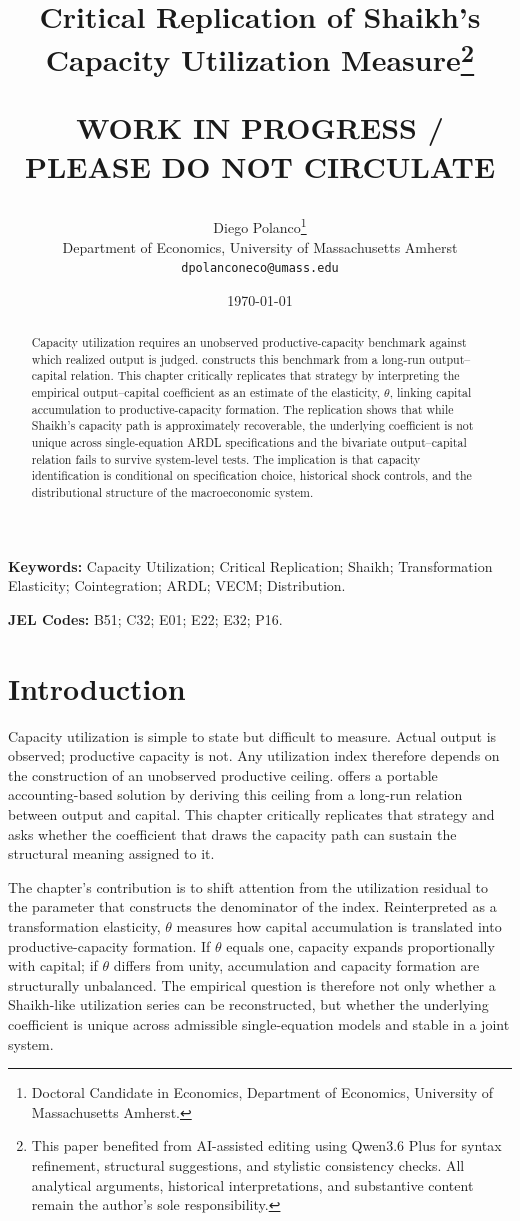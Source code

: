 \documentclass[11pt]{article}
\title{Critical Replication of Shaikh's Capacity Utilization Measure\thanks{This paper benefited from AI-assisted editing using Qwen3.6 Plus for syntax refinement, structural suggestions, and stylistic consistency checks. All analytical arguments, historical interpretations, and substantive content remain the author's sole responsibility.}\\
\begin{large}
\textbf{WORK IN PROGRESS / PLEASE DO NOT CIRCULATE}     
\end{large}
}
\author{Diego Polanco\thanks{Doctoral Candidate in Economics, Department of Economics, University of Massachusetts Amherst.}\\
Department of Economics, University of Massachusetts Amherst\\
\texttt{dpolanconeco@umass.edu}}
\date{\today}
\begin{document}
\maketitle


\begin{abstract}
Capacity utilization requires an unobserved productive-capacity benchmark against which realized output is judged. \citet{Shaikh2016} constructs this benchmark from a long-run output--capital relation. This chapter critically replicates that strategy by interpreting the empirical output--capital coefficient as an estimate of the elasticity, $\theta$, linking capital accumulation to productive-capacity formation. The replication shows that while Shaikh’s capacity path is approximately recoverable, the underlying coefficient is not unique across single-equation ARDL specifications and the bivariate output--capital relation fails to survive system-level tests. The implication is that capacity identification is conditional on specification choice, historical shock controls, and the distributional structure of the macroeconomic system.
\end{abstract}


\vspace{1cm}

\noindent\textbf{Keywords:} Capacity Utilization; Critical Replication; Shaikh; Transformation Elasticity; Cointegration; ARDL; VECM; Distribution.

\noindent\textbf{JEL Codes:} B51; C32; E01; E22; E32; P16.

\pagebreak
\section{Introduction}
\label{sec:introduction}

Capacity utilization is simple to state but difficult to measure. Actual output is observed; productive capacity is not. Any utilization index therefore depends on the construction of an unobserved productive ceiling. \citet{Shaikh2016} offers a portable accounting-based solution by deriving this ceiling from a long-run relation between output and capital. This chapter critically replicates that strategy and asks whether the coefficient that draws the capacity path can sustain the structural meaning assigned to it.

The chapter’s contribution is to shift attention from the utilization residual to the parameter that constructs the denominator of the index. Reinterpreted as a transformation elasticity, $\theta$ measures how capital accumulation is translated into productive-capacity formation. If $\theta$ equals one, capacity expands proportionally with capital; if $\theta$ differs from unity, accumulation and capacity formation are structurally unbalanced. The empirical question is therefore not only whether a Shaikh-like utilization series can be reconstructed, but whether the underlying coefficient is unique across admissible single-equation models and stable in a joint system.
\end{document}
